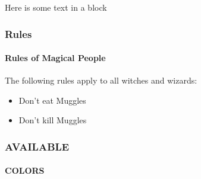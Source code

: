 \documentclass[aspectratio=169]{beamer}
\begin{document}
\begin{frame}[t]

    \vspace{2cm}
    \begin{block}{Here is some text in a block}
        \lipsum[1][1-5]
    \end{block}
    
\end{frame}

\begin{frame}
\frametitle{Rules}
\framesubtitle{Rules of Magical People}


The following rules apply to all witches and wizards:

\begin{itemize}
\item Don't eat Muggles
\item Don't kill Muggles
\end{itemize}

\end{frame}


\newcommand{\printcolour}[1]{
    {\colorbox{#1}{\mbox{\strut}}\textcolor{#1}{#1}\\}
}


\begin{frame}[t]
    \frametitle{AVAILABLE}
    \framesubtitle{COLORS}

    \begin{columns}
    \end{columns}
\end{frame}
\end{document}
